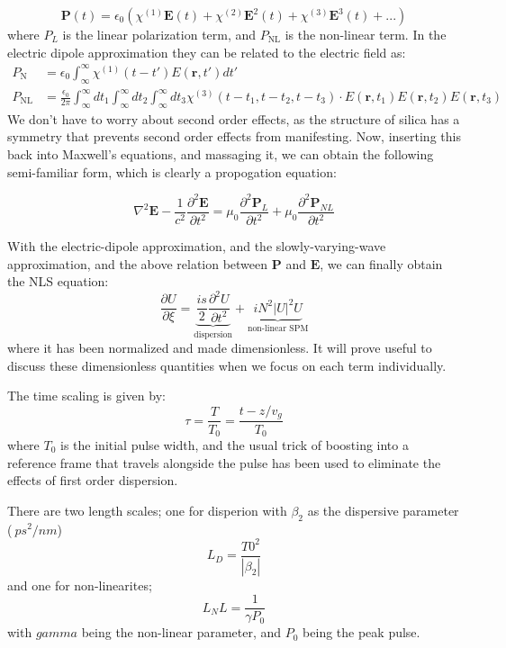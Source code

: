 \documentclass[12pt, titlepage]{article}
\renewcommand{\v}[1]{\ensuremath{\mathbf{#1}}} %
\renewcommand{\pd}[2]{\frac{\partial #1}{\partial #2}}
\newcommand{\pdd}[2]{\frac{\partial^2 #1}{\partial #2^2}}
\begin{document}
\begin{spacing}{1.1}
\begin{equation}
\v{P}(t) = \epsilon_0  \left( \chi^{(1)} \v{E}(t) + \chi^{(2)} \v{E}^2(t) + \chi^{(3)} \v{E}^3(t) +...\right)
\end{equation}
where $P_L$ is the linear polarization term, and $P_\text{NL}$ is the non-linear term.
In the electric dipole approximation they can be related to the electric field as:
\begin{align}
P_\text{N} &= \epsilon_0 \int^\infty_\infty \chi^{(1)}(t-t')E(\v{r},t')dt'\\
P_\text{NL} &= \frac{\epsilon_0}{2\pi}\int^\infty_\infty dt_1 \int^\infty_\infty dt_2\int^\infty_\infty dt_3 \chi^{(3)}(t-t_1,t-t_2,t-t_3)\cdot E(\v{r},t_1)E(\v{r},t_2)E(\v{r},t_3)
\end{align}
We don't have to worry about second order effects, as the structure of silica has a symmetry that prevents second order effects from manifesting.
Now, inserting this back into Maxwell's equations, and massaging it, we can obtain the following semi-familiar form, which is clearly a propogation equation:

\begin{equation}
\nabla^2 \v{E} - \frac{1}{c^2} \pdd{\v{E}}{t} = \mu_0 \pdd{\v{P}_L}{t} + \mu_0 \pdd{\v{P}_{NL}}{t}
\end{equation}

With the electric-dipole approximation, and the slowly-varying-wave approximation, and the above relation between $\v{P}$ and $\v{E}$, we can finally obtain the NLS equation:
\begin{equation}
\label{nlse}
\pd{U}{\xi}= \underbrace{\frac{is}{2} \pdd{U}{t}}_\text{dispersion} + \underbrace{i N^2 |U|^2U}_\text{non-linear SPM} 
\end{equation}
where it has been normalized and made dimensionless. It will prove useful to discuss these dimensionless quantities when we focus on each term individually.

The time scaling is given by:
\[ 
\tau = \frac{T}{T_0}=\frac{t-z/v_g}{T_0}
\]
where $T_0$ is the initial pulse width, and the usual trick of boosting into a reference frame that travels alongside the pulse has been used to eliminate the effects of first order dispersion.

There are two length scales; one for disperion with $\beta_2$ as the dispersive parameter ($~ps^2/nm$)
\[
L_D = \frac{T0^2}{|\beta_2|}
\]
and one for non-linearites;
\[
L_NL = \frac{1}{\gamma P_0}
\]
with $gamma$ being the non-linear parameter, and $P_0$ being the peak pulse.


\end{spacing}
\end{document}

